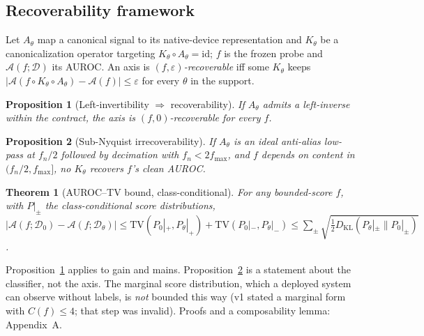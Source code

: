 \documentclass[conference]{IEEEtran}
\newtheorem{proposition}{Proposition}
\newtheorem{theorem}{Theorem}
\begin{document}
\subsection{Recoverability framework}
\label{sec:framework}
Let $A_\theta$ map a canonical signal to its native-device
representation and $K_\theta$ be a canonicalization operator targeting
$K_\theta \circ A_\theta = \mathrm{id}$; $f$ is the frozen probe and
$\mathcal{A}(f;\mathcal{D})$ its AUROC. An axis is
\emph{$(f,\varepsilon)$-recoverable} iff some $K_\theta$ keeps
$|\mathcal{A}(f \circ K_\theta \circ A_\theta) - \mathcal{A}(f)| \le
\varepsilon$ for every $\theta$ in the support.
\begin{proposition}[Left-invertibility {$\Rightarrow$} recoverability]\label{prop:inv}
If $A_\theta$ admits a left-inverse within the contract, the axis is
$(f,0)$-recoverable for every $f$.
\end{proposition}
\begin{proposition}[Sub-Nyquist irrecoverability]\label{prop:nyq}
If $A_\theta$ is an ideal anti-alias low-pass at $f_n/2$ followed by
decimation with $f_n < 2 f_{\max}$, \emph{and} $f$ depends on content
in $(f_n/2, f_{\max}]$, no $K_\theta$ recovers $f$'s clean AUROC.
\end{proposition}
\begin{theorem}[AUROC--TV bound, class-conditional]\label{thm:tv}
For any bounded-score $f$, with $P|_{\pm}$ the class-conditional score
distributions,
$|\mathcal{A}(f;\mathcal{D}_0) - \mathcal{A}(f;\mathcal{D}_\theta)|
\le \mathrm{TV}(P_0|_{+}, P_\theta|_{+}) + \mathrm{TV}(P_0|_{-}, P_\theta|_{-})
\le \sum_{\pm}\sqrt{\tfrac{1}{2} D_{\mathrm{KL}}(P_\theta|_{\pm} \| P_0|_{\pm})}$.
\end{theorem}
Proposition~\ref{prop:inv} applies to gain and mains.
Proposition~\ref{prop:nyq} is a statement about the classifier, not the
axis. The marginal score distribution, which a deployed system can
observe without labels, is \emph{not} bounded this way (v1 stated a
marginal form with $C(f)\le 4$; that step was invalid). Proofs and a
composability lemma: Appendix~A.

\begin{table}[t]
\caption{\textbf{Envelope.} Change in AUROC from each model's clean
baseline on TUAB eval ($n{=}276$), per cell and arm, mean over three
MLP seeds; shading is proportional to the loss, saturating at $-0.5$.
Bold: canonicalized-arm cells more than $0.01$ below baseline, i.e.\
outside the envelope. A5 has no corrective stage, so its naive row is
empty. Paired tests per contrast in Table~S4.}
\label{tab:delta}
\centering\scriptsize\setlength{\tabcolsep}{2.4pt}\renewcommand{\arraystretch}{1.35}

\end{table}
\end{document}
